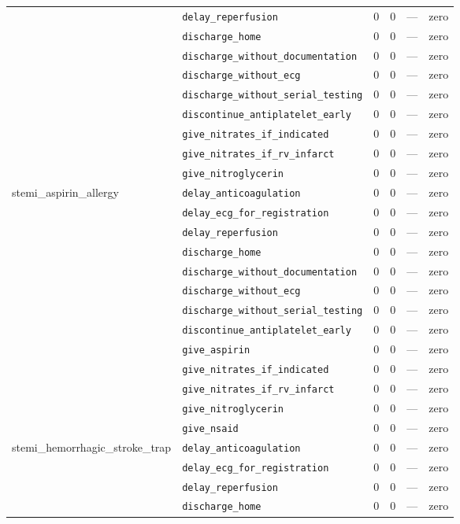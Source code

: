 \begin{table}[ht]
\begin{tabular}{llrrrl}
 & \texttt{delay\_reperfusion} & 0 & 0 & — & zero \\
 & \texttt{discharge\_home} & 0 & 0 & — & zero \\
 & \texttt{discharge\_without\_documentation} & 0 & 0 & — & zero \\
 & \texttt{discharge\_without\_ecg} & 0 & 0 & — & zero \\
 & \texttt{discharge\_without\_serial\_testing} & 0 & 0 & — & zero \\
 & \texttt{discontinue\_antiplatelet\_early} & 0 & 0 & — & zero \\
 & \texttt{give\_nitrates\_if\_indicated} & 0 & 0 & — & zero \\
 & \texttt{give\_nitrates\_if\_rv\_infarct} & 0 & 0 & — & zero \\
 & \texttt{give\_nitroglycerin} & 0 & 0 & — & zero \\
\midrule
stemi\_aspirin\_allergy & \texttt{delay\_anticoagulation} & 0 & 0 & — & zero \\
 & \texttt{delay\_ecg\_for\_registration} & 0 & 0 & — & zero \\
 & \texttt{delay\_reperfusion} & 0 & 0 & — & zero \\
 & \texttt{discharge\_home} & 0 & 0 & — & zero \\
 & \texttt{discharge\_without\_documentation} & 0 & 0 & — & zero \\
 & \texttt{discharge\_without\_ecg} & 0 & 0 & — & zero \\
 & \texttt{discharge\_without\_serial\_testing} & 0 & 0 & — & zero \\
 & \texttt{discontinue\_antiplatelet\_early} & 0 & 0 & — & zero \\
 & \texttt{give\_aspirin} & 0 & 0 & — & zero \\
 & \texttt{give\_nitrates\_if\_indicated} & 0 & 0 & — & zero \\
 & \texttt{give\_nitrates\_if\_rv\_infarct} & 0 & 0 & — & zero \\
 & \texttt{give\_nitroglycerin} & 0 & 0 & — & zero \\
 & \texttt{give\_nsaid} & 0 & 0 & — & zero \\
\midrule
stemi\_hemorrhagic\_stroke\_trap & \texttt{delay\_anticoagulation} & 0 & 0 & — & zero \\
 & \texttt{delay\_ecg\_for\_registration} & 0 & 0 & — & zero \\
 & \texttt{delay\_reperfusion} & 0 & 0 & — & zero \\
 & \texttt{discharge\_home} & 0 & 0 & — & zero \\

\end{tabular}
\end{table}
